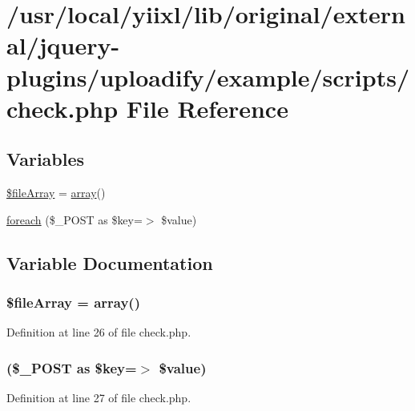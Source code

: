 \hypertarget{example_2scripts_2check_8php}{
\section{/usr/local/yiixl/lib/original/external/jquery-\/plugins/uploadify/example/scripts/check.php File Reference}
\label{example_2scripts_2check_8php}
}
\subsection*{Variables}
\begin{DoxyCompactItemize}
\item 
\hyperlink{example_2scripts_2check_8php_a82cb4ba974532399ae44234d4fcfb51a}{\$fileArray} = \hyperlink{list_8php_aa3205d038c7f8feb5c9f01ac4dfadc88}{array}()
\item 
\hyperlink{example_2scripts_2check_8php_ac6aafbc4d90cd74f481282f505f6c628}{foreach} (\$\_\-POST as \$key=$>$ \$value)
\end{DoxyCompactItemize}


\subsection{Variable Documentation}
\hypertarget{example_2scripts_2check_8php_a82cb4ba974532399ae44234d4fcfb51a}{
\subsubsection[{\$fileArray}]{\setlength{\rightskip}{0pt plus 5cm}\$fileArray = {\bf array}()}}
\label{example_2scripts_2check_8php_a82cb4ba974532399ae44234d4fcfb51a}


Definition at line 26 of file check.php.

\hypertarget{example_2scripts_2check_8php_ac6aafbc4d90cd74f481282f505f6c628}{
\subsubsection[{foreach}]{(\$\_\-POST as \$key=$>$ \$value)}}
\label{example_2scripts_2check_8php_ac6aafbc4d90cd74f481282f505f6c628}


Definition at line 27 of file check.php.

